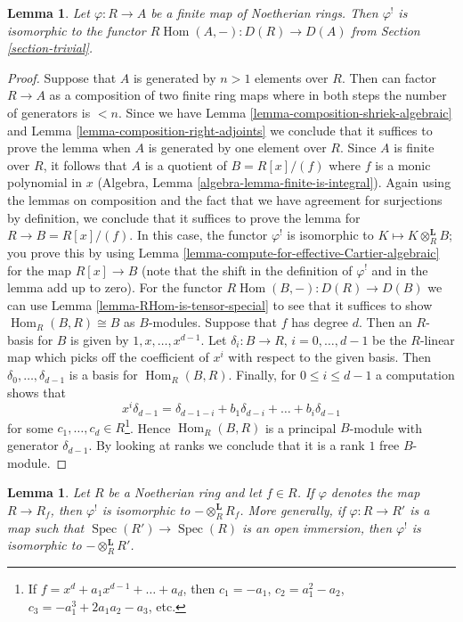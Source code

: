 \documentclass{stacks-project}
\theoremstyle{plain}
\newtheorem{lemma}[subsection]{Lemma}
\theoremstyle{definition}
\theoremstyle{remark}
\numberwithin{equation}{subsection}
\def\Spec{\mathop{\mathrm{Spec}}}
\def\Hom{\mathop{\mathrm{Hom}}\nolimits}
\begin{document}
\begin{lemma}
\label{lemma-upper-shriek-finite}
Let $\varphi : R \to A$ be a finite map of Noetherian rings.
Then $\varphi^!$ is isomorphic to the functor
$R\Hom(A, -) : D(R) \to D(A)$ from
Section \ref{section-trivial}.
\end{lemma}

\begin{proof}
Suppose that $A$ is generated by $n > 1$ elements over $R$.
Then can factor $R \to A$ as a composition of two finite ring maps
where in both steps the number of generators is $< n$.
Since we have Lemma \ref{lemma-composition-shriek-algebraic} and
Lemma \ref{lemma-composition-right-adjoints}
we conclude that it suffices
to prove the lemma when $A$ is generated by one element over $R$.
Since $A$ is finite over $R$, it follows that $A$ is a quotient
of $B = R[x]/(f)$ where $f$ is a monic polynomial in $x$
(Algebra, Lemma \ref{algebra-lemma-finite-is-integral}).
Again using the lemmas on composition and the fact that we
have agreement for surjections by definition, we conclude that
it suffices to prove the lemma for $R \to B = R[x]/(f)$.
In this case, the functor $\varphi^!$ is isomorphic to
$K \mapsto K \otimes_R^\mathbf{L} B$; you prove this by
using Lemma \ref{lemma-compute-for-effective-Cartier-algebraic}
for the map $R[x] \to B$ (note that the shift in the definition
of $\varphi^!$ and in the lemma add up to zero).
For the functor $R\Hom(B, -) : D(R) \to D(B)$ we can use
Lemma \ref{lemma-RHom-is-tensor-special}
to see that it suffices to show $\Hom_R(B, R) \cong B$
as $B$-modules. Suppose that $f$ has degree $d$.
Then an $R$-basis for $B$ is given by $1, x, \ldots, x^{d - 1}$.
Let $\delta_i : B \to R$, $i = 0, \ldots, d - 1$
be the $R$-linear map which picks off the coefficient
of $x^i$ with respect to the given basis. Then
$\delta_0, \ldots, \delta_{d - 1}$ is a basis for $\Hom_R(B, R)$.
Finally, for $0 \leq i \leq d - 1$ a computation shows that
$$
x^i \delta_{d - 1} =
\delta_{d - 1 - i} + b_1 \delta_{d - i} + \ldots + b_i \delta_{d - 1}
$$
for some $c_1, \ldots, c_d \in R$\footnote{If
$f = x^d + a_1 x^{d - 1} + \ldots + a_d$, then
$c_1 = -a_1$, $c_2 = a_1^2 - a_2$, $c_3 = -a_1^3 + 2a_1a_2 -a_3$, etc.}.
Hence $\Hom_R(B, R)$ is a principal $B$-module with generator
$\delta_{d - 1}$. By looking
at ranks we conclude that it is a rank $1$ free $B$-module.
\end{proof}

\begin{lemma}
\label{lemma-upper-shriek-localize}
Let $R$ be a Noetherian ring and let $f \in R$.
If $\varphi$ denotes the map $R \to R_f$, then $\varphi^!$
is isomorphic to $- \otimes_R^\mathbf{L} R_f$.
More generally, if $\varphi : R \to R'$ is a map such that
$\Spec(R') \to \Spec(R)$ is an open immersion, then
$\varphi^!$ is isomorphic to $- \otimes_R^\mathbf{L} R'$.
\end{lemma}
\end{document}

